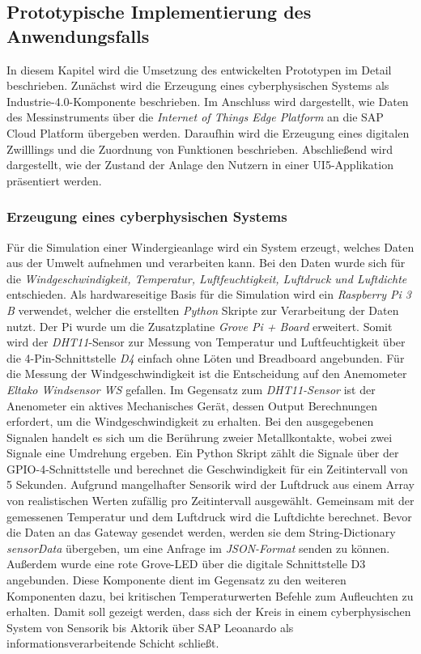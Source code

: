 

\subsection{Prototypische Implementierung des Anwendungsfalls}

In diesem Kapitel wird die Umsetzung des entwickelten Prototypen im Detail beschrieben.
Zunächst wird die Erzeugung eines cyberphysischen Systems als Industrie-4.0-Komponente beschrieben. Im Anschluss wird dargestellt, wie Daten des Messinstruments über die \textit{Internet of Things Edge Platform} an die SAP Cloud Platform übergeben werden. Daraufhin wird die Erzeugung eines digitalen Zwilllings und die Zuordnung von Funktionen beschrieben. Abschließend wird dargestellt, wie der Zustand der Anlage den Nutzern in einer UI5-Applikation präsentiert werden.

\subsubsection{Erzeugung eines cyberphysischen Systems}

Für die Simulation einer Windergieanlage wird ein System erzeugt, welches Daten aus der Umwelt aufnehmen und verarbeiten kann. Bei den Daten wurde sich für die \textit{Windgeschwindigkeit, Temperatur, Luftfeuchtigkeit, Luftdruck und Luftdichte} entschieden.
Als hardwareseitige Basis für die Simulation wird ein \textit{Raspberry Pi 3 B} verwendet, welcher die erstellten \textit{Python} Skripte zur Verarbeitung der Daten nutzt. Der Pi wurde um die Zusatzplatine \textit{Grove Pi + Board} erweitert. Somit wird der \textit{DHT11}-Sensor zur Messung von Temperatur und Luftfeuchtigkeit über die 4-Pin-Schnittstelle \textit{D4} einfach ohne Löten und Breadboard angebunden. Für die Messung der Windgeschwindigkeit ist die Entscheidung auf den Anemometer \textit{Eltako Windsensor WS} gefallen. Im Gegensatz zum \textit{DHT11-Sensor} ist der Anenometer ein aktives Mechanisches Gerät, dessen Output Berechnungen erfordert, um die Windgeschwindigkeit zu erhalten. Bei den ausgegebenen Signalen handelt es sich um die Berührung zweier Metallkontakte, wobei zwei Signale eine Umdrehung ergeben. Ein Python Skript zählt die Signale über der GPIO-4-Schnittstelle und berechnet die Geschwindigkeit für ein Zeitintervall von 5 Sekunden. Aufgrund mangelhafter Sensorik wird der Luftdruck aus einem Array von realistischen Werten zufällig pro Zeitintervall ausgewählt. Gemeinsam mit der gemessenen Temperatur und dem Luftdruck wird die Luftdichte berechnet. Bevor die Daten an das Gateway gesendet werden, werden sie dem String-Dictionary \textit{sensorData} übergeben, um eine Anfrage im \textit{JSON-Format} senden zu können.
 Außerdem wurde eine rote Grove-LED über die digitale Schnittstelle D3 angebunden. Diese Komponente dient im Gegensatz zu den weiteren Komponenten dazu, bei kritischen Temperaturwerten Befehle zum Aufleuchten zu erhalten. Damit soll gezeigt werden, dass sich der Kreis in einem cyberphysischen System von Sensorik bis Aktorik über SAP Leoanardo als informationsverarbeitende Schicht schließt.


